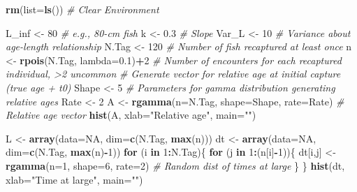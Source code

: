 \documentclass[
]{krantz}
\makeatletter
\newenvironment{Shaded}{\begin{snugshade}}{\end{snugshade}}
\newcommand{\AttributeTok}[1]{\textcolor[rgb]{0.27,0.27,0.27}{#1}}
\newcommand{\CommentTok}[1]{\textcolor[rgb]{0.37,0.37,0.37}{\textit{#1}}}
\newcommand{\ConstantTok}[1]{\textcolor[rgb]{0.37,0.37,0.37}{#1}}
\newcommand{\ControlFlowTok}[1]{\textcolor[rgb]{0.27,0.27,0.27}{\textbf{#1}}}
\newcommand{\DecValTok}[1]{\textcolor[rgb]{0.06,0.06,0.06}{#1}}
\newcommand{\FloatTok}[1]{\textcolor[rgb]{0.06,0.06,0.06}{#1}}
\newcommand{\FunctionTok}[1]{\textcolor[rgb]{0.27,0.27,0.27}{\textbf{#1}}}
\newcommand{\NormalTok}[1]{#1}
\newcommand{\OtherTok}[1]{\textcolor[rgb]{0.37,0.37,0.37}{#1}}
\newcommand{\SpecialCharTok}[1]{\textcolor[rgb]{0.43,0.43,0.43}{\textbf{#1}}}
\newcommand{\StringTok}[1]{\textcolor[rgb]{0.5,0.5,0.5}{#1}}
\newenvironment{kframe}{%
\medskip{}
\setlength{\fboxsep}{.8em}
 \def\at@end@of@kframe{}%
 \ifinner\ifhmode%
  \def\at@end@of@kframe{\end{minipage}}%
  \begin{minipage}{\columnwidth}%
 \fi\fi%
 \def\FrameCommand##1{\hskip\@totalleftmargin \hskip-\fboxsep
 \colorbox{shadecolor}{##1}\hskip-\fboxsep
     \hskip-\linewidth \hskip-\@totalleftmargin \hskip\columnwidth}%
 \MakeFramed {\advance\hsize-\width
   \@totalleftmargin\z@ \linewidth\hsize
   \@setminipage}}%
 {\par\unskip\endMakeFramed%
 \at@end@of@kframe}
\renewenvironment{Shaded}{\begin{kframe}}{\end{kframe}}
\makeatother
\begin{document}
\begin{Shaded}
\begin{Highlighting}[]
\FunctionTok{rm}\NormalTok{(}\AttributeTok{list=}\FunctionTok{ls}\NormalTok{()) }\CommentTok{\# Clear Environment}

\NormalTok{L\_inf }\OtherTok{\textless{}{-}} \DecValTok{80}  \CommentTok{\# e.g., 80{-}cm fish}
\NormalTok{k }\OtherTok{\textless{}{-}} \FloatTok{0.3} \CommentTok{\# Slope}
\NormalTok{Var\_L }\OtherTok{\textless{}{-}} \DecValTok{10} \CommentTok{\# Variance about age{-}length relationship}
\NormalTok{N.Tag }\OtherTok{\textless{}{-}} \DecValTok{120} \CommentTok{\# Number of fish recaptured at least once}
\NormalTok{n }\OtherTok{\textless{}{-}} \FunctionTok{rpois}\NormalTok{(N.Tag, }\AttributeTok{lambda=}\FloatTok{0.1}\NormalTok{)}\SpecialCharTok{+}\DecValTok{2} \CommentTok{\# Number of encounters for each recaptured individual, \textgreater{}2 uncommon}
\CommentTok{\# Generate vector for relative age at initial capture (true age + t0)}
\NormalTok{Shape }\OtherTok{\textless{}{-}} \DecValTok{5} \CommentTok{\# Parameters for gamma distribution generating relative ages}
\NormalTok{Rate }\OtherTok{\textless{}{-}} \DecValTok{2}
\NormalTok{A }\OtherTok{\textless{}{-}} \FunctionTok{rgamma}\NormalTok{(}\AttributeTok{n=}\NormalTok{N.Tag, }\AttributeTok{shape=}\NormalTok{Shape, }\AttributeTok{rate=}\NormalTok{Rate) }\CommentTok{\# Relative age vector}
\FunctionTok{hist}\NormalTok{(A, }\AttributeTok{xlab=}\StringTok{"Relative age"}\NormalTok{, }\AttributeTok{main=}\StringTok{""}\NormalTok{)}

\NormalTok{L }\OtherTok{\textless{}{-}} \FunctionTok{array}\NormalTok{(}\AttributeTok{data=}\ConstantTok{NA}\NormalTok{, }\AttributeTok{dim=}\FunctionTok{c}\NormalTok{(N.Tag, }\FunctionTok{max}\NormalTok{(n)))}
\NormalTok{dt }\OtherTok{\textless{}{-}} \FunctionTok{array}\NormalTok{(}\AttributeTok{data=}\ConstantTok{NA}\NormalTok{, }\AttributeTok{dim=}\FunctionTok{c}\NormalTok{(N.Tag, }\FunctionTok{max}\NormalTok{(n)}\SpecialCharTok{{-}}\DecValTok{1}\NormalTok{))}
\ControlFlowTok{for}\NormalTok{ (i }\ControlFlowTok{in} \DecValTok{1}\SpecialCharTok{:}\NormalTok{N.Tag)\{}
  \ControlFlowTok{for}\NormalTok{ (j }\ControlFlowTok{in} \DecValTok{1}\SpecialCharTok{:}\NormalTok{(n[i]}\SpecialCharTok{{-}}\DecValTok{1}\NormalTok{))\{}
\NormalTok{    dt[i,j] }\OtherTok{\textless{}{-}} \FunctionTok{rgamma}\NormalTok{(}\AttributeTok{n=}\DecValTok{1}\NormalTok{, }\AttributeTok{shape=}\DecValTok{6}\NormalTok{, }\AttributeTok{rate=}\DecValTok{2}\NormalTok{) }\CommentTok{\# Random dist of times at large}
\NormalTok{  \}}
\NormalTok{\}}
\FunctionTok{hist}\NormalTok{(dt, }\AttributeTok{xlab=}\StringTok{"Time at large"}\NormalTok{, }\AttributeTok{main=}\StringTok{""}\NormalTok{)}


\end{Highlighting}
\end{Shaded}
\end{document}
